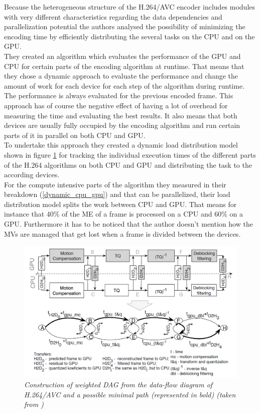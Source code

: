 Because the heterogeneous structure of the H.264/AVC encoder includes modules with very different characteristics regarding the data dependencies and parallelization potential the authors analysed the possibility of minimizing the encoding time by efficiently distributing the several tasks on the CPU and on the GPU.\\

They created an algorithm which evaluates the performance of the GPU and CPU for certain parts of the encoding algorithm at runtime. That means that they chose a dynamic approach to evaluate the performance and change the amount of work for each device for each step of the algorithm during runtime. The performance is always evaluated for the previous encoded frame. This approach has of course the negative effect of having a lot of overhead for measuring the time and evaluating the best results. It also means that both devices are usually fully occupied by the encoding algorithm and run certain parts of it in parallel on both CPU and GPU. \\
To undertake this approach they created a dynamic load distribution model shown in figure \ref{dynamic_model} for tracking the individual execution times of the different parts of the H.264 algorithms on both CPU and GPU and distributing the task to the according devices.\\
For the compute intensive parts of the algorithm they measured in their breakdown (\ref{dynamic_cpu_gpu}) and that can be parallelized, their load distribution model splits the work between CPU and GPU. That means for instance that 40\% of the ME of a frame is processed on a CPU and 60\% on a GPU. Furthermore it has to be noticed that the author doesn't mention how the MVs are managed that get lost when a frame is divided between the devices.

\begin{figure}[ht]
\centerline{\includegraphics[scale=0.4]{pics/dynamic_model}} %
\caption{\label{dynamic_model}{\it Construction of weighted DAG from the data-flow diagram of H.264/AVC and
a possible minimal path (represented in bold) (taken from \cite{Paper2})}}
\end{figure} %

